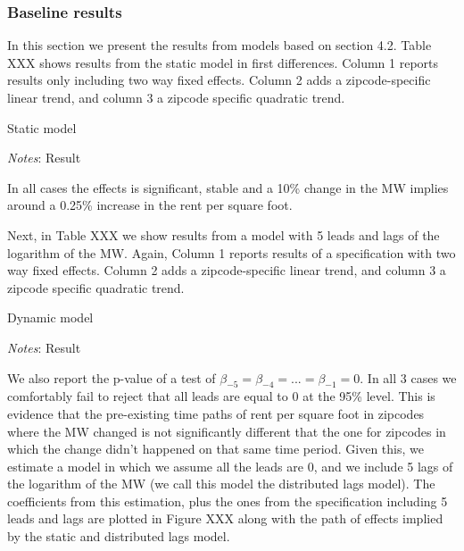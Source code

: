     \subsubsection{Baseline results}
    
    In this section we present the results from models based on section 4.2. Table XXX shows results from the static model in first differences. Column 1 reports results only including two way fixed effects. Column 2 adds a zipcode-specific linear trend, and column 3 a zipcode specific quadratic trend. 
    
    \begin{table}[h!] \centering
        \caption{Static model}
        \label{tab:fd_table}
        \scalebox{0.85}{
        }
        \begin{minipage}{.95\textwidth} \footnotesize
			\vspace{3mm} 
			\textit{Notes}: Result
		\end{minipage}
    \end{table}
    
    
    In all cases the effects is significant, stable and a 10\% change in the MW implies around a 0.25\% increase in the rent per square foot. 
    
    Next, in Table XXX we show results from a model with 5 leads and lags of the logarithm of the MW. Again, Column 1 reports results of a specification with two way fixed effects. Column 2 adds a zipcode-specific linear trend, and column 3 a zipcode specific quadratic trend. 
    
    \begin{table}[h!] \centering
        \caption{Dynamic model}
        \label{tab:fd_table}
        \scalebox{0.85}{
        }
        \begin{minipage}{.95\textwidth} \footnotesize
			\vspace{3mm} 
			\textit{Notes}: Result
		\end{minipage}
    \end{table}
    
    We also report the p-value of a test of $\beta_{-5} = \beta_{-4} = ... = \beta_{-1} = 0$. In all 3 cases we comfortably fail to reject that all leads are equal to 0 at the 95\% level. This is evidence that the pre-existing time paths of rent per square foot in zipcodes where the MW changed is not significantly different that the one for zipcodes in which the change didn't happened on that same time period. Given this, we estimate a model in which we assume all the leads are 0, and we include 5 lags of the logarithm of the MW (we call this model the distributed lags model). The coefficients from this estimation, plus the ones from the specification including 5 leads and lags are plotted in Figure XXX along with the path of effects implied by the static and distributed lags model. 
    
